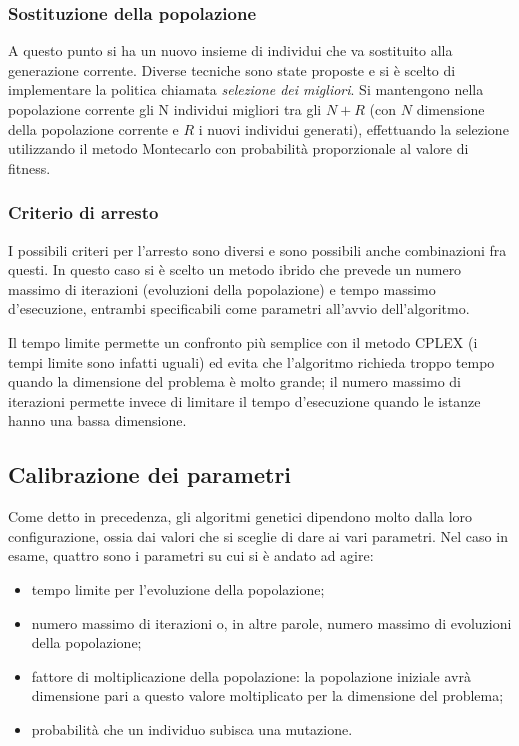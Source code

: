 \subsubsection{Sostituzione della popolazione}\label{subsubsec:sostituzione-popolazione}
A questo punto si ha un nuovo insieme di individui che va sostituito alla generazione corrente.
Diverse tecniche sono state proposte e si è scelto di implementare la politica chiamata \textit{selezione dei migliori}.
Si mantengono nella popolazione corrente gli N individui migliori tra gli $N + R$ (con $N$ dimensione della popolazione corrente
e $R$ i nuovi individui generati), effettuando la selezione utilizzando il metodo Montecarlo con probabilità
proporzionale al valore di fitness.
\subsubsection{Criterio di arresto}\label{subsubsec:criterio-arresto}
I possibili criteri per l'arresto sono diversi e sono possibili anche combinazioni fra questi.
In questo caso si è scelto un metodo ibrido che prevede un numero massimo di iterazioni (evoluzioni
della popolazione) e tempo massimo d'esecuzione, entrambi specificabili come parametri all'avvio dell'algoritmo.

Il tempo limite permette un confronto più semplice con il metodo CPLEX (i tempi limite sono infatti uguali)
ed evita che l'algoritmo richieda troppo tempo quando la dimensione del problema è molto grande;
il numero massimo di iterazioni permette invece di limitare il tempo d'esecuzione
quando le istanze hanno una bassa dimensione.
\subsection{Calibrazione dei parametri}\label{subsec:calibrazione-parametri}
Come detto in precedenza, gli algoritmi genetici dipendono molto dalla loro configurazione, ossia
dai valori che si sceglie di dare ai vari parametri.
Nel caso in esame, quattro sono i parametri su cui si è andato ad agire:
\begin{itemize}
	\item tempo limite per l'evoluzione della popolazione;
	\item numero massimo di iterazioni o, in altre parole, numero massimo di evoluzioni
	della popolazione;
	\item fattore di moltiplicazione della popolazione: la popolazione iniziale avrà dimensione pari a questo valore
	moltiplicato per la dimensione del problema;
	\item probabilità che un individuo subisca una mutazione.
\end{itemize}
%
